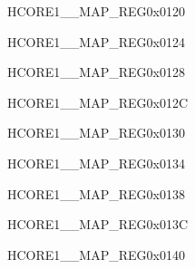 \begin{register}{H}{CORE1\_\_MAP\_REG}{0x0120}\label{regdesc:CORE1ECDSAINTMAPREG}
\end{register}\vspace{-3em}


\begin{register}{H}{CORE1\_\_MAP\_REG}{0x0124}\label{regdesc:CORE1KMINTMAPREG}

\end{register}\vspace{-3em}


\begin{register}{H}{CORE1\_\_MAP\_REG}{0x0128}\label{regdesc:CORE1GPIOINT0MAPREG}
\end{register}\vspace{-3em}


\begin{register}{H}{CORE1\_\_MAP\_REG}{0x012C}\label{regdesc:CORE1GPIOINT1MAPREG}
\end{register}\vspace{-3em}


\begin{register}{H}{CORE1\_\_MAP\_REG}{0x0130}\label{regdesc:CORE1GPIOINT2MAPREG}
\end{register}\vspace{-3em}


\begin{register}{H}{CORE1\_\_MAP\_REG}{0x0134}\label{regdesc:CORE1GPIOINT3MAPREG}
\end{register}\vspace{-3em}


\begin{register}{H}{CORE1\_\_MAP\_REG}{0x0138}\label{regdesc:CORE1GPIOPADCOMPINTMAPREG}
\end{register}\vspace{-3em}


\begin{register}{H}{CORE1\_\_MAP\_REG}{0x013C}\label{regdesc:CORE1CPUINTFROMCPU0MAPREG}
\end{register}\vspace{-3em}


\begin{register}{H}{CORE1\_\_MAP\_REG}{0x0140}\label{regdesc:CORE1CPUINTFROMCPU1MAPREG}
\end{register}\vspace{-3em}


